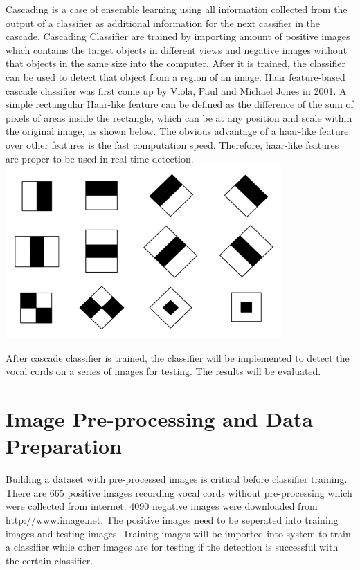 \documentclass[11pt]{article}
\makeatletter
\def\maxwidth{\ifdim\Gin@nat@width>\linewidth\linewidth
    \else\Gin@nat@width\fi}
\let\Oldincludegraphics\includegraphics
\renewcommand{\includegraphics}[1]{\Oldincludegraphics[width=.8\maxwidth]{#1}}
\makeatother
\begin{document}
Cascading is a case of ensemble learning using all information collected
from the output of a classifier as additional information for the next
cassifier in the cascade. Cascading Classifier are trained by importing
amount of positive images which contains the target objects in different
views and negative images without that objects in the same size into the
computer. After it is trained, the classifier can be used to detect that
object from a region of an image. Haar feature-based cascade classifier
was first come up by Viola, Paul and Michael Jones in 2001. A simple
rectangular Haar-like feature can be defined as the difference of the
sum of pixels of areas inside the rectangle, which can be at any
position and scale within the original image, as shown below. The
obvious advantage of a haar-like feature over other features is the fast
computation speed. Therefore, haar-like features are proper to be used
in real-time detection. \includegraphics{haar2.png}

After cascade classifier is trained, the classifier will be implemented
to detect the vocal cords on a series of images for testing. The results
will be evaluated.

    \hypertarget{image-pre-processing-and-data-preparation}{%
\section{Image Pre-processing and Data
Preparation}\label{image-pre-processing-and-data-preparation}}

    Building a dataset with pre-processed images is critical before
classifier training. There are 665 positive images recording vocal cords
without pre-processing which were collected from internet. 4090 negative
images were downloaded from http://www.image.net. The positive images
need to be seperated into training images and testing images. Training
images will be imported into system to train a classifier while other
images are for testing if the detection is successful with the certain
classifier.
\end{document}
